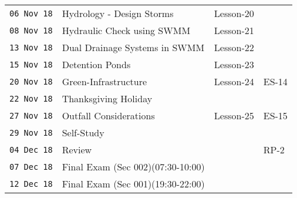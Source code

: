 \documentclass[12pt]{article}
\begin{document}
\begin{center}
\begin{table}[ht!]
\begin{tabular}{| p{0.8in} | p{3.4in} | p{1.0in} | p{1.0in} |}
\texttt{06 Nov 18} & Hydrology - Design Storms & Lesson-20 & ~ \\
\texttt{08 Nov 18} & Hydraulic Check using SWMM & Lesson-21 & ~ \\
\texttt{13 Nov 18} & Dual Drainage Systems in SWMM & Lesson-22 & ~ \\
\texttt{15 Nov 18} & Detention Ponds & Lesson-23 & ~ \\
\texttt{20 Nov 18} & Green-Infrastructure & Lesson-24 & ES-14 \\
\hline
\hline
\texttt{22 Nov 18} & Thanksgiving Holiday &  &  \\
\hline
\hline
\texttt{27 Nov 18} & Outfall Considerations & Lesson-25 & ES-15 \\
\texttt{29 Nov 18} & Self-Study &  & \\
\texttt{04 Dec 18} & Review  &  &  RP-2  \\
\hline
\hline
\texttt{07 Dec 18} & Final Exam (Sec 002)(07:30-10:00) &  &  \\
\texttt{12 Dec 18} & Final Exam (Sec 001)(19:30-22:00) &  &  \\
\hline
\hline
   \end{tabular}
   \label{tab:fall2013scheduleA}
\end{table}
\end{center}
\clearpage
\end{document}
